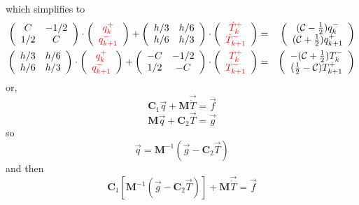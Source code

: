 which simplifies to 
\begin{eqnarray}
\left(
\begin{array}{cc}
C  & -1/2 \\
1/2 & C 
\end{array}
\right)
\cdot 
\left( 
\begin{array}{cc}
    {\color{red}q_k^+}  \\
    {\color{red}q_{k+1}^-}
\end{array}
\right)
+
\left(
\begin{array}{cc}
h/3 & h/6 \\
h/6 & h/3
\end{array}
\right)
\cdot 
\left(
\begin{array}{c}
{\color{red}\dot{T}_k^+}  \\
{\color{red}\dot{T}_{k+1}^-} 
\end{array}
\right) 
&=& 
\left(
\begin{array}{cc}
     ({\cal C}-\frac{1}{2}) q_k^-  \\
     ({\cal C}+\frac{1}{2}) q_{k+1}^+ 
\end{array}
\right)
\nonumber
\\
\left(
\begin{array}{cc}
h/3 & h/6 \\
h/6 & h/3
\end{array}
\right)
\cdot
\left(
\begin{array}{cc}
    {\color{red}q_k^+}  \\
    {\color{red}q_{k+1}^-}
\end{array}
\right)+
\left(
\begin{array}{cc}
-C  & -1/2 \\
1/2 & -C
\end{array}
\right)
\cdot
\left(
\begin{array}{cc}
 {\color{red}T_k^+}  \\
{\color{red}T_{k+1}^-} 
\end{array}
\right) 
&=& \left(
\begin{array}{cc}
     -({\cal C}+\frac{1}{2})  T_k^- \\
     (\frac{1}{2}-{\cal C})  T_{k+1}^+ 
\end{array}
\right) 
\end{eqnarray}
or, 
\[
{\bm C}_1 \vec{q} +  {\bm M} \vec{\dot{T}} = \vec{f}  
\]
\[
{\bm M} \vec{q} + {\bm C}_2 \vec{T} = \vec{g}
\]
so 
\[
 \vec{q} = {\bm M}^{-1}   (\vec{g} -  {\bm C}_2 \vec{T} )
\]
and then 
\[
{\bm C}_1 [  {\bm M}^{-1}   (\vec{g} -  {\bm C}_2 \vec{T} )   ]    +  {\bm M} \vec{\dot{T}} = \vec{f}  
\]
